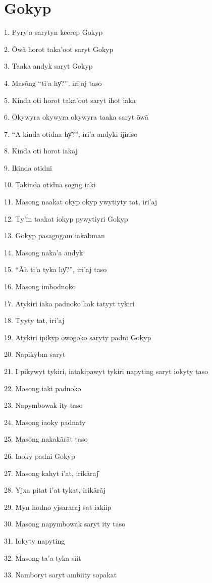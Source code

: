 \section{Gokyp}

1. Pyry'a sarytyn keerep Gokyp

2. Õwã horot taka'oot saryt Gokyp

3. Taaka andyk saryt Gokyp

4. Masõng ``ti'a hy͂?'', iri'aj taso

5. Kinda oti horot taka'oot saryt ihot iaka

6. Okywyra okywyra okywyra taaka saryt õwã

7. ``A kinda otidna hy͂?'', iri'a andyki ijiriso

8. Kinda oti horot iakaj

9. Ikinda otidni

10. Takinda otidna sogng iaki

11. Masong naakat okyp okyp ywytiyty tat, iri'aj

12. Ty'in taakat iokyp pywytiyri Gokyp

13. Gokyp pasagngam iakabman

14. Masong naka'a andyk

15. ``Ãh ti'a tyka hy͂?'', iri'aj taso

16. Masong imbodnoko

17. Atykiri iaka padnoko hak tatyyt tykiri

18. Tyyty tat, iri'aj

19. Atykiri ipikyp owogoko saryty padni Gokyp

20. Napikybm saryt

21. I pikywyt tykiri, iatakipawyt tykiri napyting saryt iokyty taso

22. Masong iaki padnoko

23. Napymbowak ity taso

24. Masong iaoky padnaty

25. Masong nakakãrãt taso

26. Iaoky padni Gokyp

27. Masong kahyt i'at, irikãraj͂

28. Yjxa pitat i'at tykat, irikãrãj

29. Myn hodno yjsararaj sat iakiip

30. Masong napymbowak saryt ity taso

31. Iokyty napyting

32. Masong ta'a tyka siit

33. Namboryt saryt ambiity sopakat

